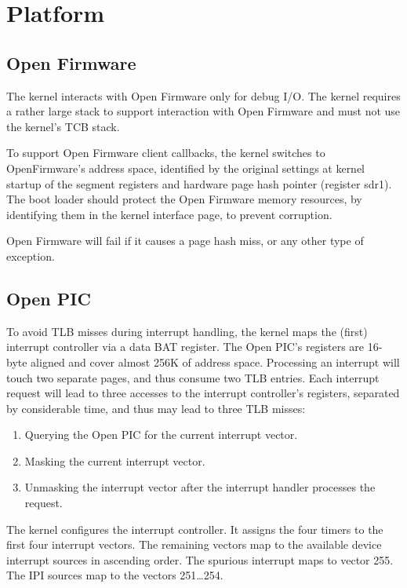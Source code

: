 \documentclass[a4paper]{article}
\newcommand{\openpic}{Open PIC}
\newcommand{\openfirmware}{Open Firmware}
\begin{document}
\section{Platform}
\subsection{\openfirmware}
The kernel interacts with \openfirmware{} only for debug I/O.  
The kernel requires a rather large stack to support interaction with
\openfirmware{} and must not use the kernel's TCB stack.

To support \openfirmware{} client callbacks, the kernel switches to 
OpenFirmware's address space, identified by the original settings
at kernel startup of the segment registers and
hardware page hash pointer (register sdr1).  The boot loader should 
protect the \openfirmware{} memory resources, by identifying them in
the kernel interface page, to prevent corruption.

\openfirmware{} will fail if it causes a page hash miss, or any other type
of exception.


\subsection{\openpic}
To avoid TLB misses during interrupt handling, the kernel maps the (first) 
interrupt 
controller via a data BAT register.  The \openpic{}'s registers are 16-byte
aligned and cover almost 256K of address space.  Processing an interrupt will
touch two separate pages, and thus consume two TLB entries.  Each
interrupt request will lead to three accesses to the interrupt controller's
registers, separated by considerable time, and thus may lead to three TLB
misses:
\begin{enumerate}
\item Querying the \openpic{} for the current interrupt vector.
\item Masking the current interrupt vector.
\item Unmasking the interrupt vector after the interrupt handler processes
      the request.
\end{enumerate}

The kernel configures the interrupt controller.  It assigns the four timers to
the first four interrupt vectors.  The remaining vectors map to the available
device interrupt sources in ascending order.  The spurious interrupt maps
to vector 255.  The IPI sources map to the vectors 251\dots 254.
\end{document}
